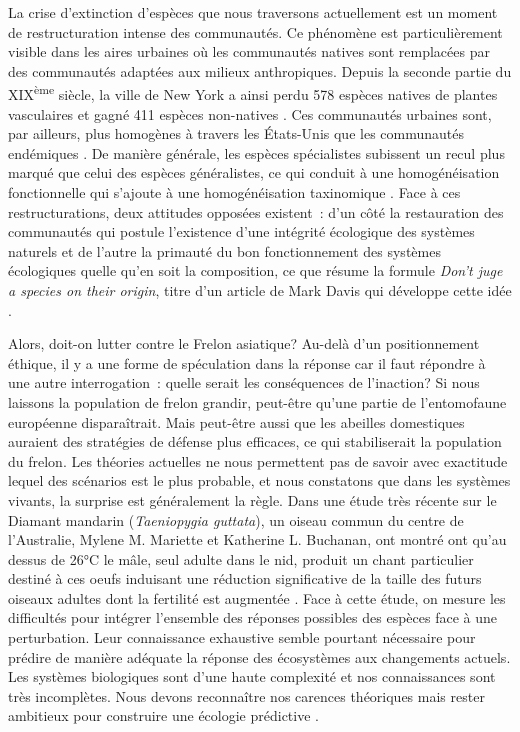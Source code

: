 La crise d'extinction d'espèces que nous traversons actuellement
\citep{Thomas2004} est un moment de restructuration intense des
communautés. Ce phénomène est particulièrement visible dans les aires
urbaines où les communautés natives sont remplacées par des communautés
adaptées aux milieux anthropiques. Depuis la seconde partie du
XIX\textsuperscript{ème} siècle, la ville de New York a ainsi perdu 578
espèces natives de plantes vasculaires et gagné 411 espèces non-natives
\citep{DeCandido2004}. Ces communautés urbaines sont, par ailleurs, plus
homogènes à travers les États-Unis que les communautés endémiques
\citep{McKinney2006}. De manière générale, les espèces spécialistes
subissent un recul plus marqué que celui des espèces généralistes, ce
qui conduit à une homogénéisation fonctionnelle qui s'ajoute à une
homogénéisation taxinomique \citep{Clavel2011}. Face à ces
restructurations, deux attitudes opposées existent~: d'un côté la
restauration des communautés qui postule l'existence d'une intégrité
écologique des systèmes naturels \citep{Suding2015} et de l'autre la
primauté du bon fonctionnement des systèmes écologiques quelle qu'en
soit la composition, ce que résume la formule \emph{Don't juge a species
on their origin}, titre d'un article de Mark Davis qui développe cette
idée \citep{Davis2011}.

Alors, doit-on lutter contre le Frelon asiatique? Au-delà d'un
positionnement éthique, il y a une forme de spéculation dans la réponse
car il faut répondre à une autre interrogation~: quelle serait les
conséquences de l'inaction? Si nous laissons la population de frelon
grandir, peut-être qu'une partie de l'entomofaune européenne
disparaîtrait. Mais peut-être aussi que les abeilles domestiques
auraient des stratégies de défense plus efficaces, ce qui stabiliserait
la population du frelon. Les théories actuelles ne nous permettent pas
de savoir avec exactitude lequel des scénarios est le plus probable, et
nous constatons que dans les systèmes vivants, la surprise est
généralement la règle. Dans une étude très récente sur le Diamant
mandarin (\emph{Taeniopygia guttata}), un oiseau commun du centre de
l'Australie, Mylene M. Mariette et Katherine L. Buchanan, ont montré ont
qu'au dessus de 26°C le mâle, seul adulte dans le nid, produit un chant
particulier destiné à ces oeufs induisant une réduction significative de
la taille des futurs oiseaux adultes dont la fertilité est augmentée
\citep{Mariette2016}. Face à cette étude, on mesure les difficultés pour
intégrer l'ensemble des réponses possibles des espèces face à une
perturbation. Leur connaissance exhaustive semble pourtant nécessaire
pour prédire de manière adéquate la réponse des écosystèmes aux
changements actuels. Les systèmes biologiques sont d'une haute
complexité et nos connaissances sont très incomplètes. Nous devons
reconnaître nos carences théoriques mais rester ambitieux pour
construire une écologie prédictive \citep{Mouquet2015}.

